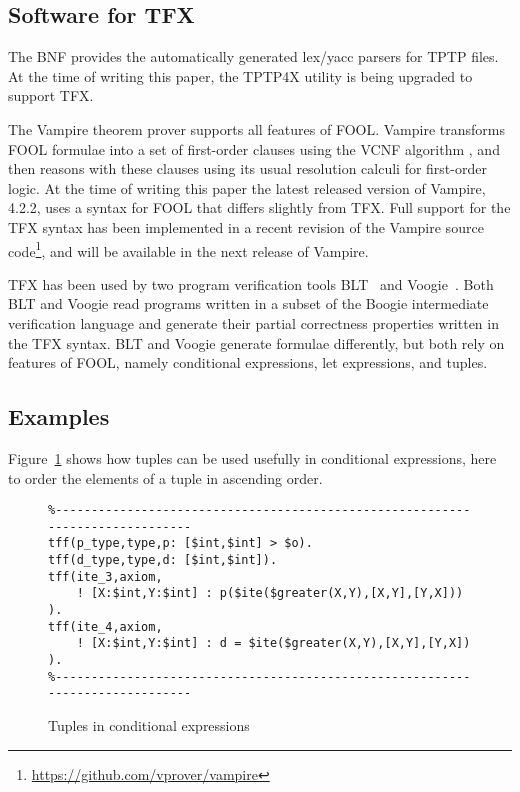 \documentclass{easychair}
\begin{document}
\subsection{Software for TFX}
\label{Software}

The BNF provides the automatically generated lex/yacc parsers for TPTP files.
At the time of writing this paper, the TPTP4X utility is being upgraded
to support TFX.

The Vampire theorem prover \cite{KV13} supports all features of FOOL. 
Vampire transforms FOOL formulae into a set of first-order clauses using the 
VCNF algorithm \cite{KK+16-GCAI}, and then reasons with these clauses using 
its usual resolution calculi for first-order logic. 
At the time of writing this paper the latest released version of Vampire,
4.2.2, uses a syntax for FOOL that differs slightly from TFX. 
Full support for the TFX syntax has been implemented in a recent revision of 
the Vampire source code\footnote{%
\url{https://github.com/vprover/vampire}}, and will be available
in the next release of Vampire.

TFX has been used by two program verification tools BLT~\cite{CF17} and
Voogie~\cite{KKV18}. 
Both BLT and Voogie read programs written in a subset of the Boogie 
intermediate verification language and generate their partial correctness 
properties written in the TFX syntax. 
BLT and Voogie generate formulae differently, but both rely on features of 
FOOL, namely conditional expressions, let expressions, and tuples.

\subsection{Examples}
\label{Examples}

Figure~\ref{TupleConditional} shows how tuples can be used usefully in 
conditional expressions, here to order the elements of a tuple in ascending
order.

\begin{figure}[htbp]
\begin{small}
\begin{verbatim}
%------------------------------------------------------------------------------
tff(p_type,type,p: [$int,$int] > $o).
tff(d_type,type,d: [$int,$int]).
tff(ite_3,axiom,
    ! [X:$int,Y:$int] : p($ite($greater(X,Y),[X,Y],[Y,X])) ).
tff(ite_4,axiom,
    ! [X:$int,Y:$int] : d = $ite($greater(X,Y),[X,Y],[Y,X]) ).
%------------------------------------------------------------------------------
\end{verbatim}
\end{small}
\caption{Tuples in conditional expressions}
\label{TupleConditional}
\end{figure}
\end{document}
